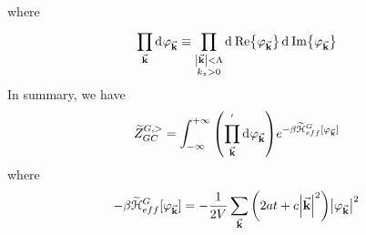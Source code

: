 \documentclass[../main/main.tex]{subfiles}
\begin{document}
where
\begin{equation}
  \prod_{\va{k}}^{} \dd[]{\varphi _{\va{k}}} \equiv \prod_{\substack{ \abs{\va{k}} < \Lambda   \\ k_z >0 } }^{}   \dd[]{\Re {\varphi _{\va{k}}}}  \dd[]{\Im {\varphi _{\va{k}}}}
\end{equation}
In summary, we have
\begin{equation}
  \widetilde{Z}_{GC}^{G,>} =  \int_{- \infty }^{+ \infty }  \qty( \prod_{\va{k}}^{'}  \dd[]{\varphi _{\va{k}}})
  e^{- \beta \widetilde{\mathcal{H}}_{eff}^G [\varphi _{\va{k}}] }
\end{equation}
where
\begin{equation}
  - \beta \widetilde{\mathcal{H}}_{eff}^G [\varphi _{\va{k}}] = - \frac{1}{2V} \sum_{\va{k}}^{} \qty(2at+c \abs{\va{k}}^2 ) \abs{\varphi _{\va{k}}}^2
\end{equation}
\end{document}
